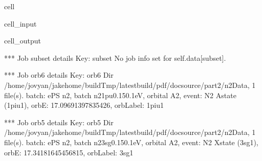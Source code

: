 \documentclass[letterpaper,table,10pt,english]{jupyterBook}
\begin{document}
\begin{sphinxuseclass}{cell}\begin{sphinxVerbatimInput}

\begin{sphinxuseclass}{cell_input}
\begin{sphinxVerbatim}[commandchars=\\\{\}]

     

\end{sphinxVerbatim}

\end{sphinxuseclass}\end{sphinxVerbatimInput}
\begin{sphinxVerbatimOutput}

\begin{sphinxuseclass}{cell_output}
\begin{sphinxVerbatim}[commandchars=\\\{\}]
*** Job subset details
Key: subset
No \PYGZsq{}job\PYGZsq{} info set for self.data[subset].

*** Job orb6 details
Key: orb6
Dir /home/jovyan/jake\PYGZhy{}home/buildTmp/\PYGZus{}latest\PYGZus{}build/pdf/doc\PYGZhy{}source/part2/n2Data, 1 file(s).
\PYGZob{}   \PYGZsq{}batch\PYGZsq{}: \PYGZsq{}ePS n2, batch n2\PYGZus{}1pu\PYGZus{}0.1\PYGZhy{}50.1eV, orbital A2\PYGZsq{},
    \PYGZsq{}event\PYGZsq{}: \PYGZsq{} N2 A\PYGZhy{}state (1piu\PYGZhy{}1)\PYGZsq{},
    \PYGZsq{}orbE\PYGZsq{}: \PYGZhy{}17.09691397835426,
    \PYGZsq{}orbLabel\PYGZsq{}: \PYGZsq{}1piu\PYGZhy{}1\PYGZsq{}\PYGZcb{}

*** Job orb5 details
Key: orb5
Dir /home/jovyan/jake\PYGZhy{}home/buildTmp/\PYGZus{}latest\PYGZus{}build/pdf/doc\PYGZhy{}source/part2/n2Data, 1 file(s).
\PYGZob{}   \PYGZsq{}batch\PYGZsq{}: \PYGZsq{}ePS n2, batch n2\PYGZus{}3sg\PYGZus{}0.1\PYGZhy{}50.1eV, orbital A2\PYGZsq{},
    \PYGZsq{}event\PYGZsq{}: \PYGZsq{} N2 X\PYGZhy{}state (3sg\PYGZhy{}1)\PYGZsq{},
    \PYGZsq{}orbE\PYGZsq{}: \PYGZhy{}17.34181645456815,
    \PYGZsq{}orbLabel\PYGZsq{}: \PYGZsq{}3sg\PYGZhy{}1\PYGZsq{}\PYGZcb{}
\end{sphinxVerbatim}

\end{sphinxuseclass}\end{sphinxVerbatimOutput}

\end{sphinxuseclass}
\end{document}
